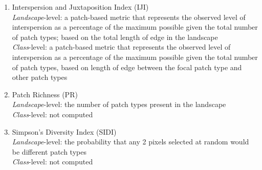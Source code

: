 \begin{itemize}
\begin{enumerate}
		\item Interspersion and Juxtaposition Index (IJI) \\
		\emph{Landscape}-level: a patch-based metric that represents the observed level of interspersion as a percentage of the maximum possible given the total number of patch types; based on the total length of edge in the landscape 	\\
		\emph{Class}-level: a patch-based metric that represents the observed level of interspersion as a percentage of the maximum possible given the total number of patch types, based on length of edge between the focal patch type and other patch types 	\\
		
		\item Patch Richness (PR)\\
		\emph{Landscape}-level: the number of patch types present in the landscape	\\
		\emph{Class}-level: not computed \\
		
		\item Simpson's Diversity Index (SIDI)\\
		\emph{Landscape}-level: the probability that any 2 pixels selected at random would be different patch types	\\
		\emph{Class}-level: not computed\\
		

\end{enumerate}
\end{itemize}
